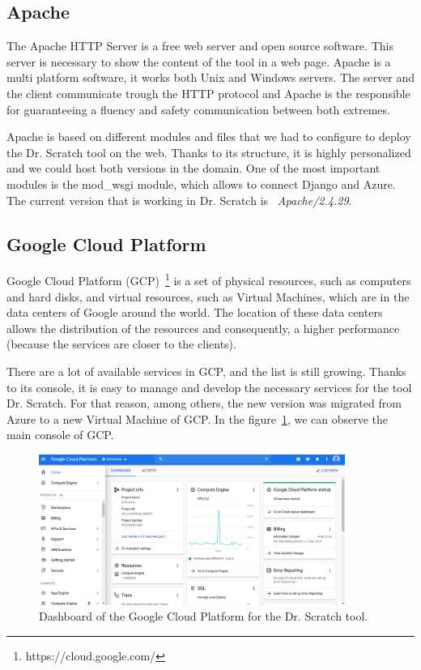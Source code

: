 \subsection{Apache}
\label{subsec:apache}

The Apache HTTP Server is a free web server and open source software. This server is necessary to show the content of the tool in a web page. Apache is a multi platform software, it works both Unix and Windows servers. The server and the client communicate trough the HTTP protocol and Apache is the responsible for guaranteeing a fluency and safety communication between both extremes.

Apache is based on different modules and files that we had to configure to deploy the Dr. Scratch tool on the web. Thanks to its structure, it is highly personalized and we could host both versions in the domain. One of the most important modules is the mod\_wsgi module, which allows to connect Django and Azure. The current version that is working in Dr. Scratch is ~\textit{Apache/2.4.29}.  


\subsection{Google Cloud Platform}
\label{subsec:google}

Google Cloud Platform (GCP)~\footnote{https://cloud.google.com/} is a set of physical resources, such as computers and hard disks, and virtual resources, such as Virtual Machines, which are in the data centers of Google around the world. The location of these data centers allows the distribution of the resources and consequently, a higher performance (because the services are closer to the clients).

There are a lot of available services in GCP, and the list is still growing. Thanks to its console, it is easy to manage and develop the necessary services for the tool Dr. Scratch. For that reason, among others, the new version was migrated from Azure to a new Virtual Machine of GCP. In the figure~\ref{fig:GCP}, we can observe the main console of GCP.

\begin{figure}
    \centering
        \includegraphics[width=10cm, keepaspectratio]{img/GCP.png}
        \caption{Dashboard of the Google Cloud Platform for the Dr. Scratch tool.}
        \label{fig:GCP}
\end{figure}




